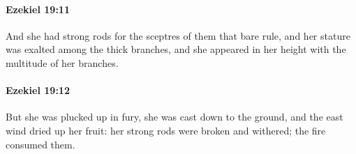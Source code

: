 		\paragraph{Ezekiel 19:11} %
			\label{EZEKIEL-19-11}

			And she had strong rods for the sceptres of them that bare rule, and her stature was exalted among the thick branches, and she appeared in her height with the multitude of her branches.


		\paragraph{Ezekiel 19:12} %
			\label{EZEKIEL-19-12}

			But she was plucked up in fury, she was cast down to the ground, and the east wind dried up her fruit: her strong rods were broken and withered; the fire consumed them.


